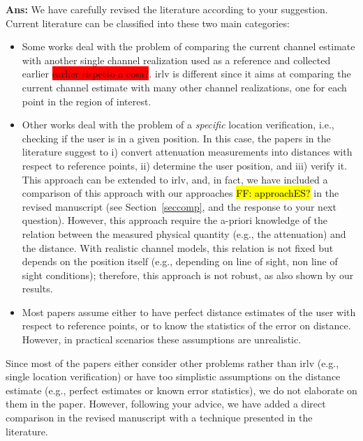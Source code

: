 \documentclass[draftcls,onecolumn,12pt]{IEEEtran}
\begin{document}
{\bf Ans:} We have carefully revised the literature according to your suggestion. Current literature can be classified into these two main categories:
\begin{itemize}
    \item Some works deal with the problem of comparing the current channel estimate with another single channel realization used as a reference and collected earlier \colorbox{red}{earlier rispetto a cosa?}. \ac{irlv} is different since it aims at comparing the current channel estimate with many other channel realizations, one for each point in the region of interest. 
    \item Other works deal with the problem of a {\em specific} location verification, i.e., checking if the user is in a given position. In this case, the papers in the literature suggest to i) convert attenuation measurements into distances with respect to reference points, ii) determine the user position, and iii) verify it. This approach can be extended to \ac{irlv}, and, in fact, we have included a comparison of this approach with our approaches \hl{FF: approachES?} in the revised manuscript (see  Section~\ref{seccomp}, and the response to your next question). However, this approach require the a-priori knowledge of the relation between the measured physical quantity (e.g., the attenuation) and the distance. With realistic channel models, this relation is not fixed but depends on the position itself (e.g., depending on line of sight, non line of sight conditions); therefore, this approach is not robust, as also shown by our results.
    \item Most papers assume either to have perfect distance estimates of the user with respect to reference points, or to know the statistics of the error on distance. However, in practical scenarios these assumptions are unrealistic.
\end{itemize}
Since most of the papers either consider other problems rather than \ac{irlv} (e.g., single location verification) or have too simplistic assumptions on the distance estimate (e.g., perfect estimates or known error statistics), we do not elaborate on them in the paper. However, following your advice, we have added a direct comparison in the revised manuscript with a technique presented in the literature.
\end{document}
